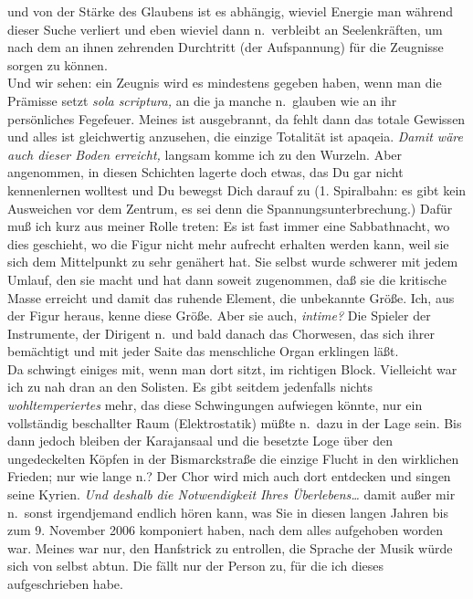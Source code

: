 \documentclass[
]{article}
\begin{document}
\begin{enumerate}
  und von der Stärke des Glaubens ist es abhängig, wieviel Energie man
  während dieser Suche verliert und eben wieviel dann n.~verbleibt an
  Seelenkräften, um nach dem an ihnen zehrenden Durchtritt (der
  Aufspannung) für die Zeugnisse sorgen zu können.\\
  Und wir sehen: ein Zeugnis wird es mindestens gegeben haben, wenn man
  die Prämisse setzt \emph{sola scriptura,} an die ja manche n.~glauben
  wie an ihr persönliches Fegefeuer. Meines ist ausgebrannt, da fehlt
  dann das totale Gewissen und alles ist gleichwertig anzusehen, die
  einzige Totalität ist apaqeia. \emph{Damit wäre auch dieser Boden
  erreicht, }langsam komme ich zu den Wurzeln. Aber angenommen, in
  diesen Schichten lagerte doch etwas, das Du gar nicht kennenlernen
  wolltest und Du bewegst Dich darauf zu (1. Spiralbahn: es gibt kein
  Ausweichen vor dem Zentrum, es sei denn die Spannungsunterbrechung.)
  Dafür muß ich kurz aus meiner Rolle treten: Es ist fast immer eine
  Sabbathnacht, wo dies geschieht, wo die Figur nicht mehr aufrecht
  erhalten werden kann, weil sie sich dem Mittelpunkt zu sehr genähert
  hat. Sie selbst wurde schwerer mit jedem Umlauf, den sie macht und hat
  dann soweit zugenommen, daß sie die kritische Masse erreicht und damit
  das ruhende Element, die unbekannte Größe. Ich, aus der Figur heraus,
  kenne diese Größe. Aber sie auch, \emph{intime?} Die Spieler der
  Instrumente, der Dirigent n.~und bald danach das Chorwesen, das sich
  ihrer bemächtigt und mit jeder Saite das menschliche Organ erklingen
  läßt.\\
  Da schwingt einiges mit, wenn man dort sitzt, im richtigen Block.
  Vielleicht war ich zu nah dran an den Solisten. Es gibt seitdem
  jedenfalls nichts \emph{wohltemperiertes} mehr, das diese Schwingungen
  aufwiegen könnte, nur ein vollständig beschallter Raum (Elektrostatik)
  müßte n.~dazu in der Lage sein. Bis dann jedoch bleiben der
  Karajansaal und die besetzte Loge über den ungedeckelten Köpfen in der
  Bismarckstraße die einzige Flucht in den wirklichen Frieden; nur wie
  lange n.? Der Chor wird mich auch dort entdecken und singen seine
  Kyrien. \emph{Und deshalb die Notwendigkeit Ihres Überlebens\ldots{}}
  damit außer mir n.~sonst irgendjemand endlich hören kann, was Sie in
  diesen langen Jahren bis zum 9. November 2006 komponiert haben, nach
  dem alles aufgehoben worden war. Meines war nur, den Hanfstrick zu
  entrollen, die Sprache der Musik würde sich von selbst abtun. Die
  fällt nur der Person zu, für die ich dieses aufgeschrieben habe.\\

\end{enumerate}
\end{document}
